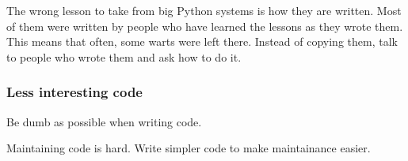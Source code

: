 The wrong lesson to take from big Python systems is how they are written.
Most of them were written by people who have learned the lessons
as they wrote them.
This means that often,
some warts were left there.
Instead of copying them,
talk to people who wrote them and ask how to do it.

\begin{frame}[fragile]
\frametitle{Less interesting code}

Be dumb as possible when writing code.

\end{frame}

Maintaining code is hard.
Write simpler code to make maintainance easier.


